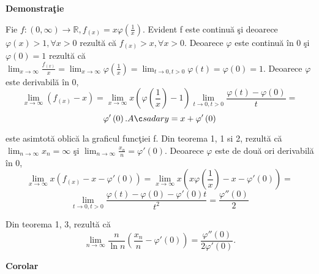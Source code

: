 \documentclass[a4paper,12pt,oneside]{report}
\begin{document}
\textbf{Demonstra\c tie} 

Fie \(f : \left ( 0,\infty  \right ) \to \mathbb{R}, f_{\left ( x \right )}= x\varphi \left ( \frac{1}{x} \right )\). Evident f este continu\u a \c si deoarece \(\varphi \left ( x \right )> 1,\forall x> 0\) rezult\u a c\u a \(f_{\left ( x \right )}> x, \forall x> 0\). Deoarece \(\varphi\) este continu\u a \^ in 0 \c si \(\varphi \left ( 0 \right )= 1\) rezult\u a c\u a \(\lim_{x \to \infty }\frac{f_{\left ( x \right )}}{x} = \lim_{x \to \infty } \varphi \left ( \frac{1}{x} \right ) = \lim_{t \to 0, t> 0 }\varphi \left ( t \right ) = \varphi \left ( 0 \right ) = 1\). Deoarece \(\varphi\) este derivabil\u a \^ in 0, 
\begin{displaymath}
  \lim_{x \to \infty }\left ( f_{\left ( x \right )} -x\right ) = \lim_{x \to \infty } x\left ( \varphi \left ( \frac{1}{x} \right ) -1\right )\lim_{t \to 0, t> 0}\frac{\varphi \left ( t \right ) - \varphi \left ( 0 \right )}{t} = 
\end{displaymath}
\begin{displaymath}
  {\varphi }'\left ( 0 \right ). A\c sadar y = x +{\varphi }'\left ( 0 \right )
\end{displaymath}

 
este asimtot\u a oblic\u a la graficul func\c tiei f. Din teorema 1, 1 si 2, rezult\u a c\u a \(\lim_{n \to \infty }x_{n} = \infty\) \c si \(\lim_{n \to \infty }\frac{x_{n}}{n} = {\varphi }'\left ( 0 \right )\). Deoarece \(\varphi\) este de dou\u a ori derivabil\u a \^ in 0,
\begin{displaymath}
  \lim_{x \to \infty }x\left ( f_{\left ( x \right ) } -x-{\varphi }'\left ( 0 \right )\right ) = \lim_{x \to \infty }x\left ( x\varphi \left ( \frac{1}{x} \right ) - x - {\varphi }'\left ( 0 \right ) \right ) = \end{displaymath}
\begin{displaymath}
  \lim_{t \to 0, t> 0}\frac{\varphi \left ( t \right ) - \varphi \left ( 0 \right )- {\varphi }'\left ( 0 \right )t}{t^{2}} = \frac{{\varphi }''\left ( 0 \right )}{2}
\end{displaymath}

Din teorema 1, 3, rezult\u a c\u a 
\begin{displaymath}
  \lim_{n \to \infty }\frac{n}{\ln n }\left ( \frac{x_{n}}{n}  - {\varphi }'\left ( 0 \right )\right ) = \frac{{\varphi }''\left ( 0 \right )}{2{\varphi }'\left ( 0 \right )}.
\end{displaymath}
 

\textbf{Corolar} 
\end{document}
